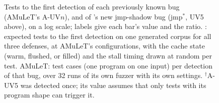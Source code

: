 \begin{figure}[t]
\centering

\caption{
Tests to the first detection of each previously known bug (AMuLeT's A-UV$n$), and of \toolname{}'s new jmp-shadow bug (jmp$^{*}$, UV5 above), on a log scale; labels give each bar's value and the ratio. \toolname{}: expected tests to the first detection on one generated corpus for all three defenses, at AMuLeT's configurations, with the cache state (warm, flushed, or filled) and the stall timing drawn at random per test. AMuLeT: test cases (one program on one input) per detection of that bug, over 32 runs of its own fuzzer with its own settings. $^{\dagger}$A-UV5 was detected once; its value assumes that only tests with its program shape can trigger it.}
\label{fig:firstdetv2}
\end{figure}

